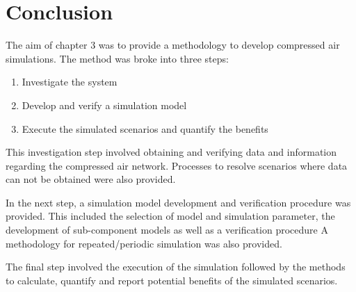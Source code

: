 \section{Conclusion}
The aim of chapter 3 was to provide a methodology to develop compressed air simulations. The method was broke into three steps:
\begin{enumerate}
	\item Investigate the system
	\item Develop and verify a simulation model
	\item Execute the simulated scenarios and quantify the benefits
\end{enumerate}
This investigation step involved obtaining and verifying data and information regarding the compressed air network. Processes to resolve scenarios where data can not be obtained were also provided.
\par 
In the next step, a simulation model development and verification procedure was provided. This included the selection of model and simulation parameter, the development of sub-component models as well as a verification procedure  A methodology for repeated/periodic simulation was also provided.
\par 
The final step involved the execution of the simulation followed by the methods to calculate, quantify and report potential benefits of the simulated scenarios. 